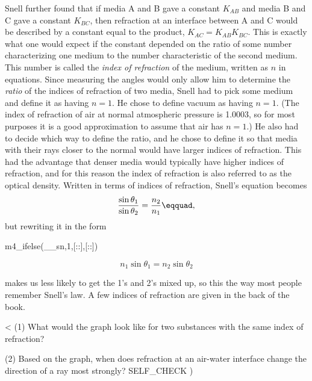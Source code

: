 Snell further found that if media A and B gave a constant
$K_{AB}$ and media B and C gave a constant $K_{BC}$,
then refraction at an interface between A and C would be
described by a constant equal to the product, $K_{AC}=K_{AB}K_{BC}$.
This is exactly what one would expect if the constant
depended on the ratio of some number characterizing one
medium to the number characteristic of the second medium.
This number is called the 
\emph{index of refraction} of the medium, written as $n$ in
equations. Since measuring the angles would only allow him
to determine the \emph{ratio} of the indices of refraction
of two media, Snell had to pick some medium and define it as
having $n=1$. He chose to define vacuum as having $n=1$.
(The index of refraction of air at normal atmospheric
pressure is 1.0003, so for most purposes it is a good
approximation to assume that air has $n=1$.) He also had to
decide which way to define the ratio, and he chose to define
it so that media with their rays closer to the normal would
have larger indices of refraction. This had the advantage
that denser media would typically have higher indices of
refraction, and for this reason the index of refraction is
also referred to as the optical density. Written in terms of
indices of refraction, Snell's equation becomes
\begin{equation*}
  \frac{\sin\theta_1}{\sin\theta_2} = \frac{n_2}{n_1}\eqquad,
\end{equation*}
but rewriting it in the form

m4_ifelse(__sn,1,[::],[:\pagebreak:])

\begin{equation*}
n_1 \sin \theta_1=n_2 \sin \theta_2
\end{equation*}
\begin{longnoteafterequation}
\end{longnoteafterequation}
\noindent makes us less likely to get the 1's and 2's mixed up, so
this the way most people remember Snell's law. A few indices
of refraction are given in the back of the book.

<%
(1) What would the graph look like for two substances with
the same index of refraction?

(2) Based on the graph, when does refraction at an air-water
interface change the direction of a ray most strongly?
  SELF_CHECK
  ) %

